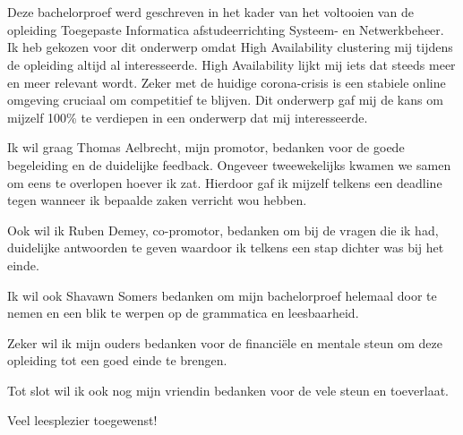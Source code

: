 
\chapter*{}
\label{ch:voorwoord}

Deze bachelorproef werd geschreven in het kader van het voltooien van de opleiding Toegepaste Informatica afstudeerrichting Systeem- en Netwerkbeheer. Ik heb gekozen voor dit onderwerp omdat High Availability clustering mij tijdens de opleiding altijd al interesseerde. High Availability lijkt mij iets dat steeds meer en meer relevant wordt. Zeker met de huidige corona-crisis is een stabiele online omgeving cruciaal om competitief te blijven. Dit onderwerp gaf mij de kans om mijzelf 100\% te verdiepen in een onderwerp dat mij interesseerde.

Ik wil graag Thomas Aelbrecht, mijn promotor, bedanken voor de goede begeleiding en de duidelijke feedback. Ongeveer tweewekelijks kwamen we samen om eens te overlopen hoever ik zat. Hierdoor gaf ik mijzelf telkens een deadline tegen wanneer ik bepaalde zaken verricht wou hebben.

Ook wil ik Ruben Demey, co-promotor, bedanken om bij de vragen die ik had, duidelijke antwoorden te geven waardoor ik telkens een stap dichter was bij het einde.

Ik wil ook Shavawn Somers bedanken om mijn bachelorproef helemaal door te nemen en een blik te werpen op de grammatica en leesbaarheid.

Zeker wil ik mijn ouders bedanken voor de financiële en mentale steun om deze opleiding tot een goed einde te brengen.

Tot slot wil ik ook nog mijn vriendin bedanken voor de vele steun en toeverlaat.

Veel leesplezier toegewenst!